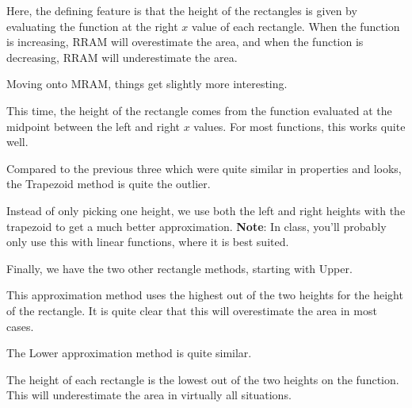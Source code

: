 \begin{figure}[H]
    \centering
    
\end{figure}

Here, the defining feature is that the height of the rectangles is given by evaluating the function at the right \( x \) value of each rectangle. When the function is increasing, RRAM will overestimate the area, and when the function is decreasing, RRAM will underestimate the area.

Moving onto MRAM, things get slightly more interesting.

\begin{figure}[H]
    \centering
    
\end{figure}

This time, the height of the rectangle comes from the function evaluated at the midpoint between the left and right \( x \) values. For most functions, this works quite well.

Compared to the previous three which were quite similar in properties and looks, the Trapezoid method is quite the outlier.

\begin{figure}[H]
    \centering
    
\end{figure}

Instead of only picking one height, we use both the left and right heights with the trapezoid to get a much better approximation. \textbf{Note}: In class, you'll probably only use this with linear functions, where it is best suited.

Finally, we have the two other rectangle methods, starting with Upper.

\begin{figure}[H]
    \centering
    
\end{figure}

This approximation method uses the highest out of the two heights for the height of the rectangle. It is quite clear that this will overestimate the area in most cases.

The Lower approximation method is quite similar.

\begin{figure}[H]
    \centering
    
\end{figure}

The height of each rectangle is the lowest out of the two heights on the function. This will underestimate the area in virtually all situations.

